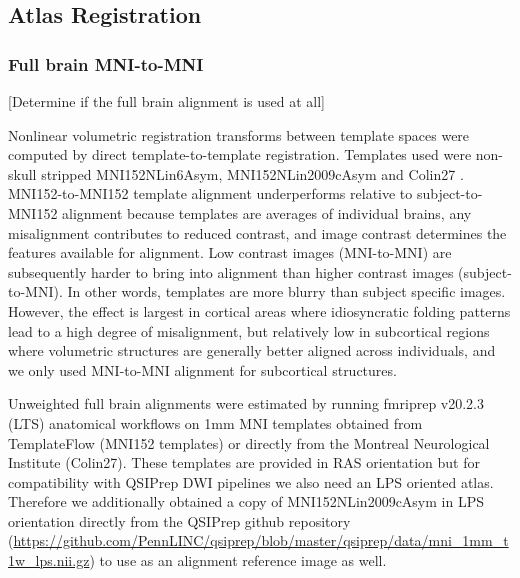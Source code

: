 \documentclass[10pt,letterpaper]{article}
\begin{document}
\subsection{Atlas Registration}
\subsubsection{Full brain MNI-to-MNI} [Determine if the full brain alignment is used at all]

Nonlinear volumetric registration transforms between template spaces were computed by direct template-to-template registration. Templates used were non-skull stripped MNI152NLin6Asym, MNI152NLin2009cAsym and Colin27 . MNI152-to-MNI152 template alignment underperforms relative to subject-to-MNI152 alignment because templates are averages of individual brains, any misalignment contributes to reduced contrast, and image contrast determines the features available for alignment. Low contrast images (MNI-to-MNI) are subsequently harder to bring into alignment than higher contrast images (subject-to-MNI). In other words, templates are more blurry than subject specific images. However, the effect is largest in cortical areas where idiosyncratic folding patterns lead to a high degree of misalignment, but relatively low in subcortical regions where volumetric structures are generally better aligned across individuals, and we only used MNI-to-MNI alignment for subcortical structures. 

Unweighted full brain alignments were estimated by running fmriprep v20.2.3 (LTS) anatomical workflows on 1mm MNI templates obtained from TemplateFlow (MNI152 templates) or directly from the Montreal Neurological Institute (Colin27). These templates are provided in RAS orientation but for compatibility with QSIPrep DWI pipelines we also need an LPS oriented atlas. Therefore we additionally obtained a copy of MNI152NLin2009cAsym in LPS orientation directly from the QSIPrep github repository (\url{https://github.com/PennLINC/qsiprep/blob/master/qsiprep/data/mni_1mm_t1w_lps.nii.gz}) to use as an alignment reference image as well.
\end{document}
